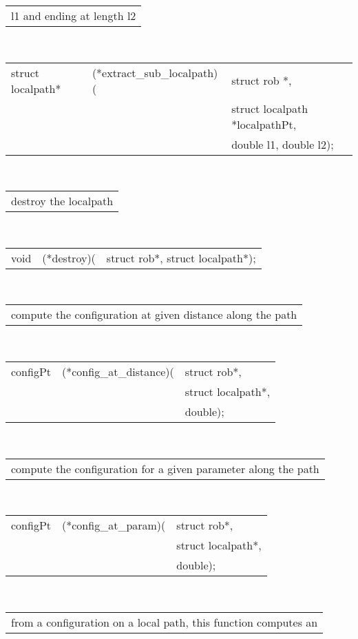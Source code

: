 \begin{itemize}
\begin{tabular}{l}
  l1 and ending at length l2 
\end{tabular}\\
\begin{tabular}{l l l}
  struct localpath* &(*extract\_sub\_localpath)(&struct rob *, \\
                                             &&struct localpath *localpathPt, \\
                                             &&double l1, double l2);\\
\end{tabular}\\
\begin{tabular}{l}\\
   destroy the localpath 
\end{tabular}\\
\begin{tabular}{l l l}
  void &(*destroy)(&struct rob*, struct localpath*); \\
\end{tabular}\\
\begin{tabular}{l}\\
  compute the configuration at given distance along the path 
\end{tabular}\\
\begin{tabular}{l l l}
  configPt &(*config\_at\_distance)(&struct rob*, \\
                                 &&struct localpath*, \\
                                 &&double); \\
\end{tabular}\\
\begin{tabular}{l}\\
   compute the configuration for a given parameter along the path
\end{tabular}\\
\begin{tabular}{l l l}
  configPt &(*config\_at\_param)(&struct rob*,\\
                              &&struct localpath*,\\
                              &&double); \\
\end{tabular}\\
\begin{tabular}{l}\\
from a configuration on a local path, this function computes an \\

\end{tabular}
\end{itemize}
